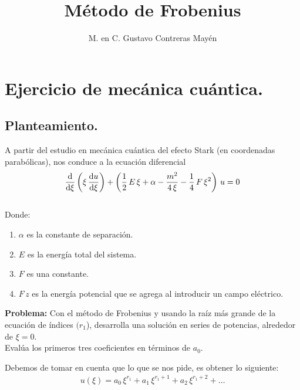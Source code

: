 
\title{Método de Frobenius} \vspace{-3ex}
\author{M. en C. Gustavo Contreras Mayén}
\date{ }
\newcommand{\Cancel}[2][black]{{\color{#1}\cancel{\color{black}#2}}}

\vspace{-4cm}
\maketitle
\fontsize{14}{14}\selectfont
\tableofcontents
\newpage

\section{Ejercicio de mecánica cuántica.}
\subsection{Planteamiento.}

A partir del estudio en mecánica cuántica del efecto Stark (en coordenadas parabólicas), nos conduce a la ecuación diferencial
\begin{align*}
\dv{\xi} \left( \xi\, \dv{u}{\xi} \right) + \left( \dfrac{1}{2} \, E \, \xi + \alpha - \dfrac{m^{2}}{4 \, \xi} - \dfrac{1}{4} \, F \, \xi^{2} \right) \, u = 0
\end{align*}
\\
Donde:
\begin{enumerate}
\item $\alpha$ es la constante de separación.
\item $E$ es la energía total del sistema.
\item $F$ es una constante.
\item $F \, z$ es la energía potencial que se agrega al introducir un campo eléctrico.
\end{enumerate}

\textbf{Problema: } Con el método de Frobenius y usando la raíz más grande de la ecuación de índices $(r_{1}$), desarrolla una solución en series de potencias, alrededor de $\xi=0$.
\\
Evalúa los primeros tres coeficientes en términos de $a_{0}$.
\par
Debemos de tomar en cuenta que lo que se nos pide, es obtener lo siguiente:
\begin{align*}
u(\xi) = a_{0} \, \xi^{r_{1}} + a_{1} \, \xi ^{r_{1}+1} + a_{2} \, \xi ^{r_{1}+2} + \ldots 
\end{align*}

